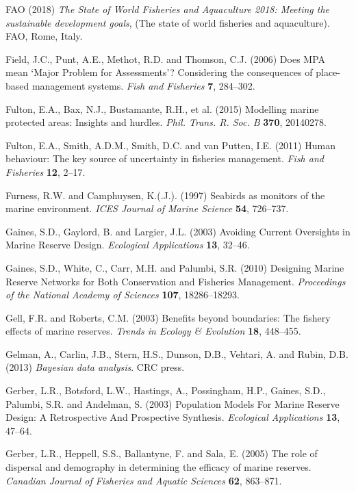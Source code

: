\documentclass[twoside,12pt,final]{ucthesis-CA2012}
\begin{document}
\begin{ucmainmatter}
\hypertarget{ref-FAO2018}{}
FAO (2018) \emph{The State of World Fisheries and Aquaculture 2018:
Meeting the sustainable development goals}, (The state of world
fisheries and aquaculture). FAO, Rome, Italy.

\hypertarget{ref-Field2006}{}
Field, J.C., Punt, A.E., Methot, R.D. and Thomson, C.J. (2006) Does MPA
mean `Major Problem for Assessments'? Considering the consequences of
place-based management systems. \emph{Fish and Fisheries} \textbf{7},
284--302.

\hypertarget{ref-Fulton2015}{}
Fulton, E.A., Bax, N.J., Bustamante, R.H., et al. (2015) Modelling
marine protected areas: Insights and hurdles. \emph{Phil. Trans. R. Soc.
B} \textbf{370}, 20140278.

\hypertarget{ref-Fulton2011}{}
Fulton, E.A., Smith, A.D.M., Smith, D.C. and van Putten, I.E. (2011)
Human behaviour: The key source of uncertainty in fisheries management.
\emph{Fish and Fisheries} \textbf{12}, 2--17.

\hypertarget{ref-Furness1997}{}
Furness, R.W. and Camphuysen, K.(.J.). (1997) Seabirds as monitors of
the marine environment. \emph{ICES Journal of Marine Science}
\textbf{54}, 726--737.

\hypertarget{ref-Gaines2003}{}
Gaines, S.D., Gaylord, B. and Largier, J.L. (2003) Avoiding Current
Oversights in Marine Reserve Design. \emph{Ecological Applications}
\textbf{13}, 32--46.

\hypertarget{ref-Gaines2010}{}
Gaines, S.D., White, C., Carr, M.H. and Palumbi, S.R. (2010) Designing
Marine Reserve Networks for Both Conservation and Fisheries Management.
\emph{Proceedings of the National Academy of Sciences} \textbf{107},
18286--18293.

\hypertarget{ref-Gell2003}{}
Gell, F.R. and Roberts, C.M. (2003) Benefits beyond boundaries: The
fishery effects of marine reserves. \emph{Trends in Ecology \&
Evolution} \textbf{18}, 448--455.

\hypertarget{ref-Gelman2013}{}
Gelman, A., Carlin, J.B., Stern, H.S., Dunson, D.B., Vehtari, A. and
Rubin, D.B. (2013) \emph{Bayesian data analysis}. CRC press.

\hypertarget{ref-Gerber2003}{}
Gerber, L.R., Botsford, L.W., Hastings, A., Possingham, H.P., Gaines,
S.D., Palumbi, S.R. and Andelman, S. (2003) Population Models For Marine
Reserve Design: A Retrospective And Prospective Synthesis.
\emph{Ecological Applications} \textbf{13}, 47--64.

\hypertarget{ref-Gerber2005}{}
Gerber, L.R., Heppell, S.S., Ballantyne, F. and Sala, E. (2005) The role
of dispersal and demography in determining the efficacy of marine
reserves. \emph{Canadian Journal of Fisheries and Aquatic Sciences}
\textbf{62}, 863--871.


\end{ucmainmatter}
\end{document}

